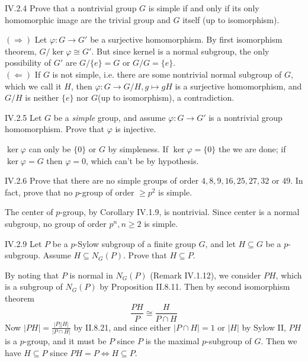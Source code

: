 \begin{problem}{IV.2.4}
Prove that a nontrivial group $G$ is simple if and only if its only homomorphic image are the trivial group and $G$ itself (up to isomorphism).
\end{problem}
\begin{pf}

\noindent $(\Rightarrow)$ Let $\varphi : G \to G'$ be a surjective homomorphism. By first isomorphism theorem, $G/\ker \varphi \cong G'$. But since kernel is a normal subgroup, the only possibility of $G'$ are $G/\{e\} = G$ or $G/G = \{e\}$. \\
$(\Leftarrow)$ If $G$ is not simple, i.e. there are some nontrivial normal subgroup of $G$, which we call it $H$, then $\varphi : G \to G/H,g \mapsto gH$ is a surjective homomorphism, and $G/H$ is neither $\{e\}$ nor $G$(up to isomorphism), a contradiction. 
\end{pf}

\begin{problem}{IV.2.5}
Let $G$ be a \emph{simple} group, and assume $\varphi: G \to G'$ is a nontrivial group homomorphism. Prove that $\varphi$ is injective.
\end{problem}
\begin{pf}
$\ker \varphi$ can only be $\{0\}$ or $G$ by simpleness. If $\ker \varphi = \{0\}$ the we are done; if $\ker \varphi = G$ then $\varphi = 0$, which can't be by hypothesis.
\end{pf}

\begin{problem}{IV.2.6}
Prove that there are no simple groups of order $4, 8, 9, 16, 25, 27, 32$ or $49$. In fact, prove that no $p$-group of order $\geq p^2$ is simple.
\end{problem}
\begin{pf}
The center of $p$-group, by Corollary IV.1.9, is nontrivial. Since center is a normal subgroup, no group of order $p^n, n \geq 2$ is simple.    
\end{pf}

\begin{problem}{IV.2.9}
Let $P$ be a $p$-Sylow subgroup of a finite group $G$, and let $H \subseteq G$ be a $p$-subgroup. Assume $H \subseteq N_G(P)$. Prove that $H \subseteq P$.
\end{problem}
\begin{pf}
By noting that $P$ is normal in $N_G(P)$ (Remark IV.1.12), we consider $PH$, which is a subgroup of $N_G(P)$ by Proposition II.8.11. Then by second isomorphism theorem
\[
\frac{PH}{P} \cong \frac{H}{P \cap H}	
\]
Now $|PH| = \frac{|P||H|}{|P \cap H|}$ by II.8.21, and since either $|P \cap H| = 1$ or $|H|$ by Sylow II, $PH$ is a $p$-group, and it must be $P$ since $P$ is the maximal $p$-subgroup of $G$. Then we have $H \subseteq P$ since $PH = P \Leftrightarrow H \subseteq P$.
\end{pf}



